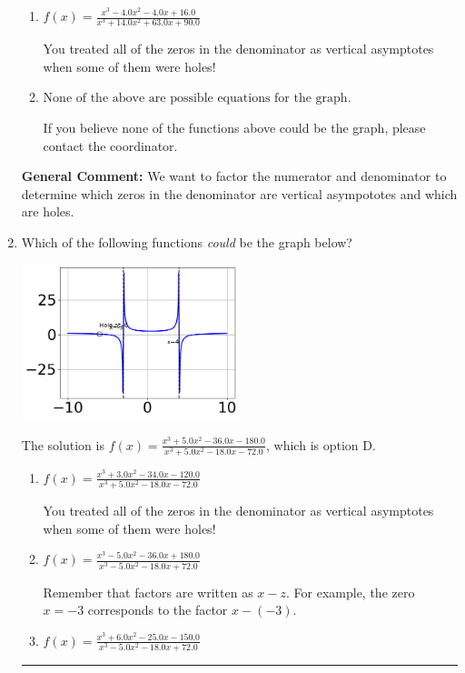 \documentclass{extbook}[14pt]
\newcommand{\litem}[1]{\item #1

\rule{\textwidth}{0.4pt}}
\begin{document}
\begin{enumerate}
{\begin{enumerate}[label=\Alph*.]
Remember that factors are written as $x-z$. For example, the zero $x=-6$ corresponds to the factor $x-(-6)$.
\item \( f(x)=\frac{x^{3} -4.0 x^{2} -4.0 x + 16.0}{x^{3} +14.0 x^{2} +63.0 x + 90.0} \)

You treated all of the zeros in the denominator as vertical asymptotes when some of them were holes!
\item \( \text{None of the above are possible equations for the graph.} \)

If you believe none of the functions above could be the graph, please contact the coordinator.
\end{enumerate}

\textbf{General Comment:} We want to factor the numerator and denominator to determine which zeros in the denominator are vertical asympototes and which are holes.
}
\litem{
Which of the following functions \textit{could} be the graph below?

\begin{center}
    \includegraphics[width=0.5\textwidth]{../Figures/identifyGraphOfRationalFunctionB.png}
\end{center}


The solution is \( f(x)=\frac{x^{3} +5.0 x^{2} -36.0 x -180.0}{x^{3} +5.0 x^{2} -18.0 x -72.0} \), which is option D.\begin{enumerate}[label=\Alph*.]
\item \( f(x)=\frac{x^{3} +3.0 x^{2} -34.0 x -120.0}{x^{3} +5.0 x^{2} -18.0 x -72.0} \)

You treated all of the zeros in the denominator as vertical asymptotes when some of them were holes!
\item \( f(x)=\frac{x^{3} -5.0 x^{2} -36.0 x + 180.0}{x^{3} -5.0 x^{2} -18.0 x + 72.0} \)

Remember that factors are written as $x-z$. For example, the zero $x=-3$ corresponds to the factor $x-(-3)$.
\item \( f(x)=\frac{x^{3} +6.0 x^{2} -25.0 x -150.0}{x^{3} -5.0 x^{2} -18.0 x + 72.0} \)


\end{enumerate}}
\end{enumerate}
\end{document}
